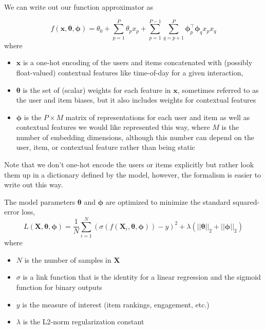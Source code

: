 \documentclass{article}
\begin{document}
We can write out our function approximator as

\begin{equation}
    f(\mathbf{x},\boldsymbol{\theta},\boldsymbol{\phi}) = \theta_0 + \sum_{p=1}^{P}\theta_p x_p + \sum_{p=1}^{P-1}\sum_{q=p+1}^{P}\boldsymbol{\phi}_p^\top \boldsymbol{\phi}_q x_p x_q
\end{equation}where 
\begin{itemize}
\item $\mathbf{x}$ is a one-hot encoding of the users and items concatenated with (possibly float-valued) contextual features like time-of-day for a given interaction,
\item  $\boldsymbol{\theta}$ is the set of (scalar) weights for each feature in $\mathbf{x}$, sometimes referred to as the user and item biases, but it also includes weights for contextual features
\item $\boldsymbol{\phi}$ is the $P\times M$ matrix of representations for each user and item as well as contextual features we would like represented this way, where $M$ is the number of embedding dimensions, although this number can depend on the user, item, or contextual feature rather than being static
\end{itemize}
Note that we don't one-hot encode the users or items explicitly but rather look them up in a dictionary defined by the model, however, the formalism is easier to write out this way. 

The model parameters $\boldsymbol{\theta}$ and $\boldsymbol{\phi}$ are optimized to minimize the standard squared-error loss\cite{CF_neural, CF_neural2},
\begin{equation}
    L(\mathbf{X},\boldsymbol{\theta},\boldsymbol{\phi}) = \frac{1}{N}\sum_{i=1}^{N}(\sigma(f(\mathbf{X}_i,\boldsymbol{\theta},\boldsymbol{\phi})) - y)^2 + \lambda \left(||\boldsymbol{\theta}||_2 +  ||\boldsymbol{\phi}||_2\right)
\end{equation}where 
\begin{itemize}
\item $N$ is the number of samples in $\mathbf{X}$
\item $\sigma$ is a link function that is the identity for a linear regression and the sigmoid function for binary outputs
\item $y$ is the measure of interest (item rankings, engagement, etc.)
\item $\lambda$ is the L2-norm regularization constant
\end{itemize}
\end{document}
